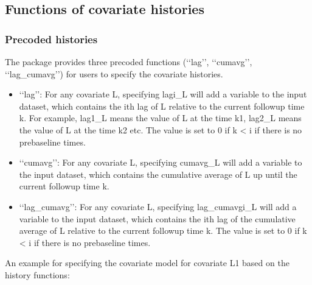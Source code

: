 \documentclass[letterpaper,10pt,english]{sphinxmanual}
\begin{document}
\subsection{Functions of covariate histories}
\label{\detokenize{Specifications/Covariate models:functions-of-covariate-histories}}

\subsubsection{Pre\sphinxhyphen{}coded histories}
\label{\detokenize{Specifications/Covariate models:pre-coded-histories}}
\sphinxAtStartPar
The package provides three pre\sphinxhyphen{}coded functions (‘‘lag’’, ‘‘cumavg’’, ‘‘lag\_cumavg’’) for users to specify the covariate histories.
\begin{itemize}
\item {} 
\sphinxAtStartPar
‘‘lag’’: For any covariate L, specifying lagi\_L will add a variable to the input dataset, which contains the i\sphinxhyphen{}th lag of L relative to the
current follow\sphinxhyphen{}up time k. For example, lag1\_L means the value of L at the time k\sphinxhyphen{}1,
lag2\_L means the value of L at the time k\sphinxhyphen{}2 etc. The value is set to 0 if k \textless{} i if there is no pre\sphinxhyphen{}baseline times.

\item {} 
\sphinxAtStartPar
‘‘cumavg’’:  For any covariate L, specifying cumavg\_L will add a variable to the input dataset, which contains the cumulative
average of L up until the current follow\sphinxhyphen{}up time k.

\item {} 
\sphinxAtStartPar
‘‘lag\_cumavg’’: For any covariate L, specifying lag\_cumavgi\_L will add a variable to the input dataset, which contains
the i\sphinxhyphen{}th lag of the cumulative average of L relative to the current follow\sphinxhyphen{}up time k. The value is set to 0 if k \textless{} i
if there is no pre\sphinxhyphen{}baseline times.

\end{itemize}

\sphinxAtStartPar
An example for specifying the covariate model for covariate L1 based on the history functions:

\begin{sphinxVerbatim}[commandchars=\\\{\}]
          
\end{sphinxVerbatim}
\end{document}
